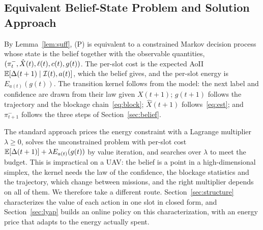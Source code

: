 \subsection{Equivalent Belief-State Problem and Solution Approach}
By Lemma~\ref{lem:suff}, (P) is equivalent to a constrained Markov decision process whose state is the belief together with the observable quantities, $(\pi^-_t,\hat X(t),\ell(t),c(t),g(t))$. The per-slot cost is the expected AoII $\mathbb{E}[\Delta(t+1)\mid\mathcal{I}(t),a(t)]$, which the belief gives, and the per-slot energy is $E_{a(t)}(g(t))$. The transition kernel follows from the model: the next label and confidence are drawn from their law given $X(t+1)$; $g(t+1)$ follows the trajectory and the blockage chain~\eqref{eq:block}; $\hat X(t+1)$ follows~\eqref{eq:est}; and $\pi^-_{t+1}$ follows the three steps of Section~\ref{sec:belief}.

The standard approach prices the energy constraint with a Lagrange multiplier $\lambda\ge0$, solves the unconstrained problem with per-slot cost $\mathbb{E}[\Delta(t+1)]+\lambda E_{a(t)}(g(t))$ by value iteration, and searches over $\lambda$ to meet the budget. This is impractical on a UAV: the belief is a point in a high-dimensional simplex, the kernel needs the law of the confidence, the blockage statistics and the trajectory, which change between missions, and the right multiplier depends on all of them. We therefore take a different route. Section~\ref{sec:structure} characterizes the value of each action in one slot in closed form, and Section~\ref{sec:lyap} builds an online policy on this characterization, with an energy price that adapts to the energy actually spent.
